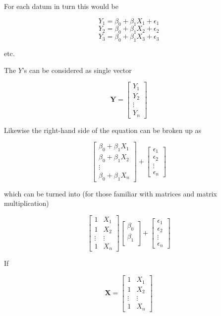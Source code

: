 \documentclass[
  oneside]{krantz}
\begin{document}
For each datum in turn this would be

\[ Y_1 = \beta_0+\beta_1 X_1 + \epsilon_1 \]
\[ Y_2 = \beta_0+\beta_1 X_2 + \epsilon_2 \]
\[ Y_3 = \beta_0+\beta_1 X_3 + \epsilon_3 \]

etc.

The \(Y\)'s can be considered as single vector

\[
\mathbf{Y} = \left[\begin{array}
{r}
Y_1  \\
Y_2  \\
\vdots\\
Y_n
\end{array}\right]
\]

Likewise the right-hand side of the equation can be broken up as

\[
\left[\begin{array}
{r}
\beta_0 + \beta_1 X_1 \\
 \beta_0 + \beta_1 X_2 \\  
\vdots \\
\beta_0+\beta_1 X_n
\end{array}\right] +
\left[\begin{array}
{r}
\epsilon_1 \\
 \epsilon_2 \\  
\vdots\\
\epsilon_n
\end{array}\right]
\]

which can be turned into (for those familiar with matrices and matrix multiplication)

\[
\left[\begin{array}
{rr}
1 & X_1 \\
1 & X_2 \\  
\vdots & \vdots\\
1 & X_n
\end{array}\right] 
\left[\begin{array}
{r}
\beta_0 \\
\beta_1 \\  
\end{array}\right] +
\left[\begin{array}
{r}
\epsilon_1 \\
\epsilon_2 \\  
\vdots\\
\epsilon_n
\end{array}\right]
\]

If

\[
\mathbf{X} = 
\left[\begin{array}
{rr}
1 & X_1 \\
1 & X_2 \\  
\vdots & \vdots\\
1 & X_n
\end{array}\right] 
\]
\end{document}
